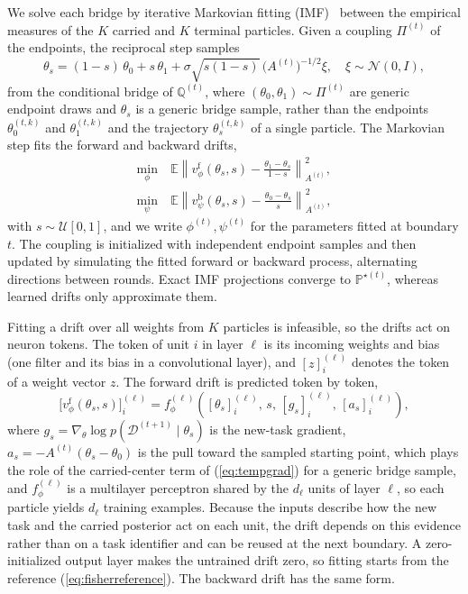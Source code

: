 \documentclass{article}
\begin{document}
We solve each bridge by iterative Markovian fitting
(IMF)~\cite{shi2023dsbm,peluchetti2023idbm} between the empirical measures of
the $K$ carried and $K$ terminal particles. Given a coupling $\Pi^{(t)}$ of the
endpoints, the reciprocal step samples
\begin{equation}
    \theta_s=(1-s)\,\theta_0+s\,\theta_1
    +\sigma\sqrt{s(1-s)}\,\big(A^{(t)}\big)^{-1/2}\xi,
    \quad \xi\sim\mathcal{N}(0,I),
    \label{eq:conditionalbridge}
\end{equation}
from the conditional bridge of $\mathbb{Q}^{(t)}$, where
$(\theta_0,\theta_1)\sim\Pi^{(t)}$ are generic endpoint draws and $\theta_s$ is
a generic bridge sample, rather than the endpoints $\theta^{(t,k)}_0$ and
$\theta^{(t,k)}_1$ and the trajectory $\theta^{(t,k)}_s$ of a single
particle. The Markovian step fits the forward and
backward drifts,
\begin{align}
    \min_\phi\ &\mathbb{E}\left\|v^{\mathrm{f}}_\phi(\theta_s,s)
    -\frac{\theta_1-\theta_s}{1-s}\right\|_{A^{(t)}}^{2},
    \label{eq:lossf}\\
    \min_\psi\ &\mathbb{E}\left\|v^{\mathrm{b}}_\psi(\theta_s,s)
    -\frac{\theta_0-\theta_s}{s}\right\|_{A^{(t)}}^{2},
    \label{eq:lossb}
\end{align}
with $s\sim\mathcal{U}[0,1]$, and we write $\phi^{(t)},\psi^{(t)}$ for the
parameters fitted at boundary $t$. The coupling is initialized with independent
endpoint samples and then updated by simulating the fitted forward or backward
process, alternating directions between rounds. Exact IMF projections converge
to $\mathbb{P}^{\star(t)}$, whereas learned drifts only approximate them.

Fitting a drift over all weights from $K$ particles is infeasible, so the drifts
act on neuron tokens. The token of unit $i$ in layer $\ell$ is its incoming
weights and bias (one filter and its bias in a convolutional layer), and
$[z]^{(\ell)}_i$ denotes the token of a weight vector $z$. The forward drift is
predicted token by token,
\begin{equation}
    \big[v^{\mathrm{f}}_\phi(\theta_s,s)\big]^{(\ell)}_i
    =f^{(\ell)}_\phi\!\left([\theta_s]^{(\ell)}_i,\,s,\,[g_s]^{(\ell)}_i,\,
    [a_s]^{(\ell)}_i\right),
    \label{eq:tokendrift}
\end{equation}
where $g_s=\nabla_\theta\log p(\mathcal{D}^{(t+1)}\mid\theta_s)$ is the new-task
gradient, $a_s=-A^{(t)}(\theta_s-\theta_0)$ is the pull toward the sampled starting
point, which plays the role of the carried-center term of
(\ref{eq:tempgrad}) for a generic bridge sample, and $f^{(\ell)}_\phi$ is a multilayer
perceptron shared by the $d_\ell$ units of layer $\ell$, so each particle yields
$d_\ell$ training examples. Because the inputs describe how the new task and the
carried posterior act on each unit, the drift depends on this evidence rather
than on a task identifier and can be reused at the next boundary. A
zero-initialized output layer makes the untrained drift zero, so fitting starts
from the reference (\ref{eq:fisherreference}). The backward drift has the same
form.
\end{document}
